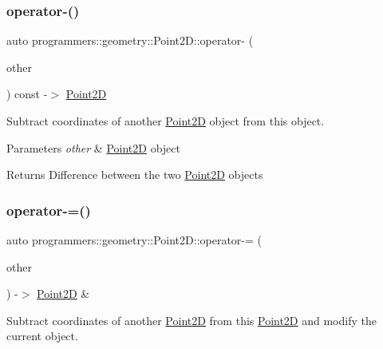 \subsubsection{\texorpdfstring{operator-\/()}{operator-()}}
{\footnotesize\ttfamily auto programmers\+::geometry\+::\+Point2\+D\+::operator-\/ (\begin{DoxyParamCaption}\item[{const \hyperlink{classprogrammers_1_1geometry_1_1Point2D}{Point2D} \&}]{other }\end{DoxyParamCaption}) const -\/$>$  \hyperlink{classprogrammers_1_1geometry_1_1Point2D}{Point2D}}



Subtract coordinates of another \hyperlink{classprogrammers_1_1geometry_1_1Point2D}{Point2D} object from this object. 


\begin{DoxyParams}{Parameters}
{\em other} & \hyperlink{classprogrammers_1_1geometry_1_1Point2D}{Point2D} object \\
\hline
\end{DoxyParams}
\begin{DoxyReturn}{Returns}
Difference between the two \hyperlink{classprogrammers_1_1geometry_1_1Point2D}{Point2D} objects 
\end{DoxyReturn}
\mbox{\label{classprogrammers_1_1geometry_1_1Point2D_a8fd22e413a3145b405cbb66184236ffb}} 
\subsubsection{\texorpdfstring{operator-\/=()}{operator-=()}}
{\footnotesize\ttfamily auto programmers\+::geometry\+::\+Point2\+D\+::operator-\/= (\begin{DoxyParamCaption}\item[{const \hyperlink{classprogrammers_1_1geometry_1_1Point2D}{Point2D} \&}]{other }\end{DoxyParamCaption}) -\/$>$  \hyperlink{classprogrammers_1_1geometry_1_1Point2D}{Point2D} \&}



Subtract coordinates of another \hyperlink{classprogrammers_1_1geometry_1_1Point2D}{Point2D} from this \hyperlink{classprogrammers_1_1geometry_1_1Point2D}{Point2D} and modify the current object. 


